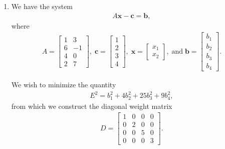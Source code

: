 \documentclass[10pt]{article}
\renewcommand{\vec}{\mathbf}
\begin{document}
\begin{enumerate}
    \newpage
  \item We have the system \begin{align} \label{eq:2sys}
      A\vec{x} - \vec{c} = \vec{b},
  \end{align} where \begin{align*}
      A = \begin{bmatrix}
        1 & 3 \\ 6 & -1 \\ 4 & 0 \\ 2 & 7
      \end{bmatrix},\;\vec{c} = \begin{bmatrix}
        1 \\ 2 \\ 3 \\ 4
      \end{bmatrix},\;\vec{x}=\begin{bmatrix}
        x_1 \\ x_2
      \end{bmatrix},\;\mathrm{and}\;\vec{b}=\begin{bmatrix}
        b_1 \\ b_2 \\ b_3 \\ b_4
      \end{bmatrix}.
  \end{align*}
  
  We wish to minimize the quantity \begin{align*}
      E^2 = b_1^2 + 4b_2^2 + 25b_3^2 + 9b_4^2,
  \end{align*} from which we construct the diagonal weight matrix \begin{align*}
      D = \begin{bmatrix}
        1 & 0 & 0 & 0 \\
        0 & 2 & 0 & 0 \\
        0 & 0 & 5 & 0 \\
        0 & 0 & 0 & 3
      \end{bmatrix}.
  \end{align*}


\end{enumerate}
\end{document}
